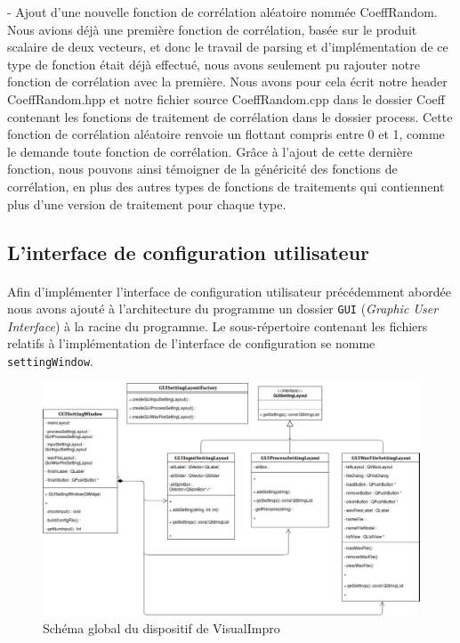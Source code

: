   - Ajout d'une nouvelle fonction de corrélation aléatoire nommée CoeffRandom.
  Nous avions déjà une première fonction de corrélation, basée sur le produit
  scalaire de deux vecteurs, et donc le travail de parsing et d'implémentation
  de ce type de fonction était déjà effectué, nous avons seulement pu rajouter
  notre fonction de corrélation avec la première. Nous avons pour cela écrit
  notre header CoeffRandom.hpp et notre fichier source CoeffRandom.cpp dans le
  dossier Coeff contenant les fonctions de traitement de corrélation dans le
  dossier process. Cette fonction de corrélation aléatoire renvoie un flottant
  compris entre 0 et 1, comme le demande toute fonction de corrélation. Grâce à
  l'ajout de cette dernière fonction, nous pouvons ainsi témoigner de la
  généricité des fonctions de corrélation, en plus des autres types de fonctions
  de traitements qui contiennent plus d'une version de traitement pour chaque
  type.

\subsection{L'interface de configuration utilisateur}
\paragraph{}
Afin d'implémenter l'interface de configuration utilisateur précédemment abordée
nous avons ajouté à l'architecture du programme un dossier
\verb!GUI! (\textit{Graphic User Interface}) à la racine du programme.
Le sous-répertoire contenant les fichiers relatifs à l'implémentation de
l'interface de configuration se nomme \verb!settingWindow!.

\begin{figure}[h]
 \centering
 \includegraphics[scale=0.3]{umlSettingWindow.png}
 \caption{Schéma global du dispositif de VisualImpro}
 \label{schéma global}
\end{figure}


